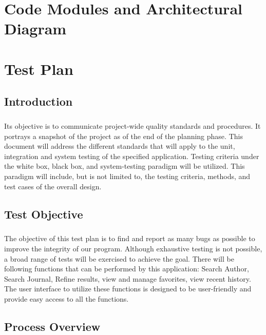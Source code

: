 \documentclass[a4paper,10pt]{scrreprt}
\begin{document}
\chapter{Code Modules and Architectural Diagram}

\chapter{Test Plan}
\section{Introduction}
\paragraph{}
Its objective is to communicate project-wide quality standards and procedures. It portrays a snapshot of the project as of the end of the planning phase. This document will address the different standards that will apply to the unit, integration and system testing of the specified application. Testing criteria under the white box, black box, and system-testing paradigm will be utilized. This paradigm will include, but is not limited to, the testing criteria, methods, and test cases of the overall design.
\section{Test Objective}
\paragraph{}
The objective of this test plan is to find and report as many bugs as possible to improve the integrity of our program. Although exhaustive testing is not possible, a broad range of tests will be exercised to achieve the goal. There will be following functions that can be performed by this application: Search Author, Search Journal, Refine results, view and manage favorites, view recent history. The user interface to utilize these functions is designed to be user-friendly and provide easy access to all the functions.
\section{Process Overview}
\end{document}
